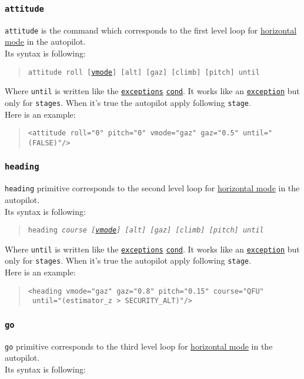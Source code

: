 \documentclass{article}
\renewcommand{\tt}[1]{\texttt{#1}}
\newcommand{\ex}[1]{\colorbox[gray]{0.92}{\tt{#1}}}
\newcommand{\hs}[1]{\hspace*{#1cm}}
\newcommand{\until}{%
	\tt{until} is written like the \tt{\hyperlink{exceptions}{exceptions}}
		\tt{\hyperlink{cond}{cond}}. It works like an
		\tt{\hyperlink{exceptions}{exception}} but only for \tt{stages}.
		When it's true the autopilot apply following \tt{stage}.
}
\newcommand{\qt}[1]{\textcolor{gris75}{#1}}
\begin{document}
\hypertarget{attitude}{\subsubsection{\tt{attitude}}}
\tt{attitude} is the command which corresponds to the first level loop for
\hyperlink{horizontalmodes}{horizontal mode} in the autopilot. \\
Its syntax is following:

\begin{quote}
	\tt{attitude \qt{roll [\hyperlink{verticalmodes}{vmode}] [alt] [gaz] [climb] [pitch] until}}
\end{quote}

Where \until \\

Here is an example:
\begin{quote}
	\ex{<attitude roll="\qt{0}" pitch="\qt{0}" vmode="\qt{gaz}" gaz="\qt{0.5}" until="\qt{(FALSE)}"/>}
\end{quote}


\hypertarget{heading}{\subsubsection{\tt{heading}}}
\tt{heading} primitive corresponds to the second level loop for
\hyperlink{horizontalmodes}{horizontal mode} in the autopilot. \\
Its syntax is following:

\begin{quote}
	\tt{heading \emph{course [\hyperlink{verticalmodes}{vmode}] [alt] [gaz] [climb] [pitch] until}}
\end{quote}

Where \until \\

Here is an example:
\begin{quote}
	\ex{<heading vmode="\qt{gaz}" gaz="\qt{0.8}" pitch="\qt{0.15}" course="\qt{QFU}"} \\
	\ex{\hs{1.5} until="\qt{(estimator\_z > SECURITY\_ALT)}"/>}
\end{quote}


\hypertarget{go}{\subsubsection{\tt{go}}}
\tt{go} primitive corresponds to the third level loop for
\hyperlink{horizontalmodes}{horizontal mode} in the autopilot. \\
Its syntax is following:
\end{document}
